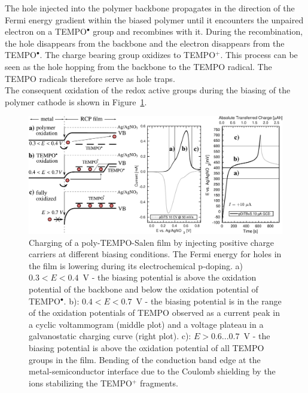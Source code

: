 The hole injected into the polymer backbone propagates in the direction of the Fermi energy gradient within the biased polymer until it encounters the unpaired electron on a TEMPO$^{\bullet}$ group and recombines with it. During the recombination, the hole disappears from the backbone and the electron disappears from the TEMPO$^{\bullet}$. The charge bearing group oxidizes to TEMPO$^+$. This process can be seen as the hole hopping from the backbone to the TEMPO radical. The TEMPO radicals therefore serve as hole traps.\\

The consequent oxidation of the redox active groups during the biasing of the polymer cathode is shown in Figure~\ref{fig:biasing_charging}.

\begin{figure}[h]
\center
	\includegraphics[width=1\textwidth]{./electrochemistry/figures/transport_in_film.pdf}
	\caption{Charging of a poly-TEMPO-Salen film by injecting positive charge carriers at different biasing conditions. The Fermi energy for holes in the film is lowering during its electrochemical p-doping. a) $0.3<E<0.4$~V - the biasing potential is above the oxidation potential of the backbone and below the oxidation potential of TEMPO$^{\bullet}$. b): $0.4<E<0.7$~V - the biasing potential is in the range of the oxidation potentials of TEMPO observed as a current peak in a cyclic voltammogram (middle plot) and a voltage plateau in a galvanostatic charging curve (right plot). c): $E>0.6...0.7$~V - the biasing potential is above the oxidation potential of all TEMPO groups in the film. Bending of the conduction band edge at the metal-semiconductor interface due to the Coulomb shielding by the ions stabilizing the TEMPO$^+$ fragments.}
	\label{fig:biasing_charging}
\end{figure}
